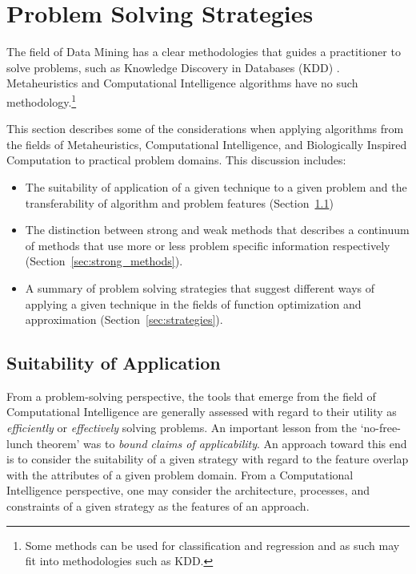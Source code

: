 
\section{Problem Solving Strategies} 
\label{advanced:sec:problem_solving}

The field of Data Mining has a clear methodologies that guides a practitioner to solve problems, such as Knowledge Discovery in Databases (KDD) \cite{Fayyad1996}. Metaheuristics and Computational Intelligence algorithms have no such methodology.\footnote{Some methods can be used for classification and regression and as such may fit into methodologies such as KDD.}

This section describes some of the considerations when applying algorithms from the fields of Metaheuristics, Computational Intelligence, and Biologically Inspired Computation to practical problem domains. This discussion includes:

\begin{itemize} 
  \item The suitability of application of a given technique to a given problem and the transferability of algorithm and problem features (Section~\ref{sec:suitability})
  \item The distinction between strong and weak methods that describes a continuum of methods that use more or less problem specific information respectively (Section~\ref{sec:strong_methods}).
	\item A summary of problem solving strategies that suggest different ways of applying a given technique in the fields of function optimization and approximation (Section~\ref{sec:strategies}).
\end{itemize}

%
%
\subsection{Suitability of Application}
\label{sec:suitability}
From a problem-solving perspective, the tools that emerge from the field of Computational Intelligence are generally assessed with regard to their utility as \emph{efficiently} or \emph{effectively} solving problems.
An important lesson from the `no-free-lunch theorem' was to \emph{bound claims of applicability}. An approach toward this end is to consider the suitability of a given strategy with regard to the feature overlap with the attributes of a given problem domain. From a Computational Intelligence perspective, one may consider the architecture, processes, and constraints of a given strategy as the features of an approach. 

